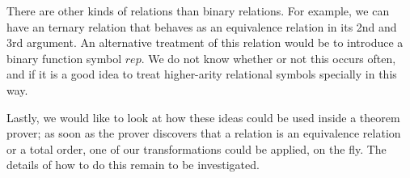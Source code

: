 \documentclass{article}
\begin{document}
There are other kinds of relations than binary relations. For example, we can have an ternary relation that behaves as an equivalence relation in its 2nd and 3rd argument. An alternative treatment of this relation would be to introduce a binary function symbol \ensuremath{rep}. We do not know whether or not this occurs often, and if it is a good idea to treat higher-arity relational symbols specially in this way.

Lastly, we would like to look at how these ideas could be used inside a theorem prover; as soon as the prover discovers that a relation is an equivalence relation or a total order, one of our transformations could be applied, on the fly. The details of how to do this remain to be investigated.




\end{document}
